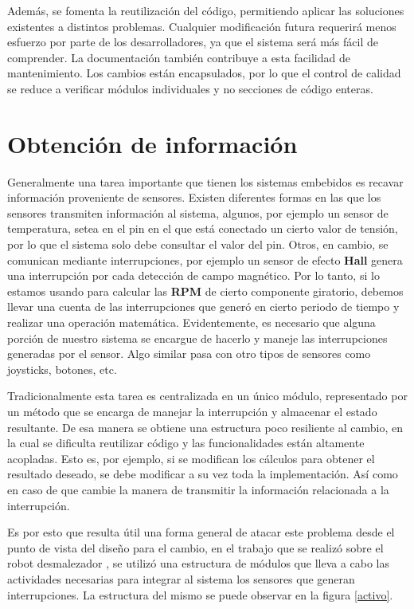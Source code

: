 Además, se fomenta la reutilización del código, permitiendo aplicar las soluciones existentes a distintos problemas. Cualquier modificación futura requerirá menos esfuerzo por parte de los desarrolladores, ya que el sistema será más fácil de comprender. La documentación también contribuye a esta facilidad de mantenimiento. Los cambios están encapsulados, por lo que el control de calidad se reduce a verificar módulos individuales y no secciones de código enteras.


\newpage
\section{Obtención de información}
\label{obtInfo}

Generalmente una tarea importante que tienen los sistemas embebidos es recavar información proveniente de sensores. Existen diferentes formas en las que los sensores transmiten información al sistema, algunos, por ejemplo un sensor de temperatura, setea en el pin en el que está conectado un cierto valor de tensión, por lo que el sistema solo debe consultar el valor del pin. Otros, en cambio, se comunican mediante interrupciones, por ejemplo un sensor de efecto \textbf{Hall} genera una interrupción por cada detección de campo magnético. Por lo tanto, si lo estamos usando para calcular las \textbf{RPM} de cierto componente giratorio, debemos llevar una cuenta de las interrupciones que generó en cierto periodo de tiempo y realizar una operación matemática. Evidentemente, es necesario que alguna porción de nuestro sistema se encargue de hacerlo y maneje las interrupciones generadas por el sensor. Algo similar pasa con otro tipos de sensores como joysticks, botones, etc.

Tradicionalmente esta tarea es centralizada en un único módulo, representado por un método que se encarga de manejar la interrupción y almacenar el estado resultante. De esa manera se obtiene una estructura poco resiliente al cambio, en la cual se dificulta reutilizar código y las funcionalidades están altamente acopladas. Esto es, por ejemplo, si se modifican los cálculos para obtener el resultado deseado, se debe modificar a su vez toda la implementación. Así como en caso de que cambie la manera de transmitir la información relacionada a la interrupción. 

Es por esto que resulta útil una forma general de atacar este problema desde el punto de vista del diseño para el cambio, en el trabajo que se realizó sobre el robot desmalezador \cite{paperPomponio}, se utilizó una estructura de módulos que lleva a cabo las actividades necesarias para integrar al sistema los sensores que generan interrupciones. La estructura del mismo se puede observar en la figura \ref{activo}.


